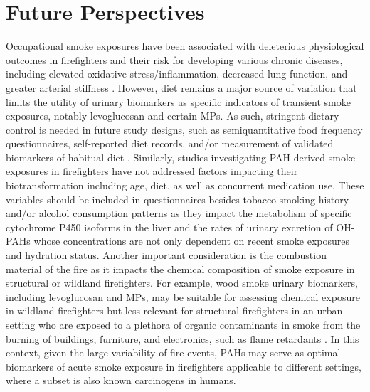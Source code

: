 \documentclass[preprint, 3p,
authoryear]{elsarticle} %
\begin{document}
\section{Future Perspectives}\label{future-perspectives}

Occupational smoke exposures have been associated with deleterious
physiological outcomes in firefighters and their risk for developing
various chronic diseases, including elevated oxidative
stress/inflammation, decreased lung function, and greater arterial
stiffness \citep[\citet{43}]{41}. However, diet remains a major source
of variation that limits the utility of urinary biomarkers as specific
indicators of transient smoke exposures, notably levoglucosan and
certain MPs. As such, stringent dietary control is needed in future
study designs, such as semiquantitative food frequency questionnaires,
self-reported diet records, and/or measurement of validated biomarkers
of habitual diet \citep{44}. Similarly, studies investigating
PAH-derived smoke exposures in firefighters have not addressed factors
impacting their biotransformation including age, diet, as well as
concurrent medication use. These variables should be included in
questionnaires besides tobacco smoking history and/or alcohol
consumption patterns as they impact the metabolism of specific
cytochrome P450 isoforms in the liver and the rates of urinary excretion
of OH-PAHs \citep{45} whose concentrations are not only dependent on
recent smoke exposures and hydration status. Another important
consideration is the combustion material of the fire as it impacts the
chemical composition of smoke exposure in structural or wildland
firefighters. For example, wood smoke urinary biomarkers, including
levoglucosan and MPs, may be suitable for assessing chemical exposure in
wildland firefighters \citep{46} but less relevant for structural
firefighters in an urban setting who are exposed to a plethora of
organic contaminants in smoke from the burning of buildings, furniture,
and electronics, such as flame retardants \citep{47}. In this context,
given the large variability of fire events, PAHs may serve as optimal
biomarkers of acute smoke exposure in firefighters applicable to
different settings, where a subset is also known carcinogens in humans.
\end{document}
